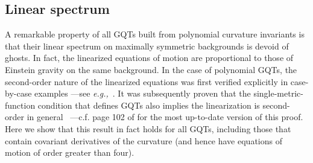 \documentclass[11pt]{article}
\newcommand{\eg}{{\it e.g.,}\ }
\begin{document}
{\subsection{Linear spectrum}\label{subsec:linearGQT}
A remarkable property of all GQTs built from polynomial curvature invariants is that their linear spectrum on maximally symmetric backgrounds is devoid of ghosts. In fact, the linearized equations of motion are proportional to those of Einstein gravity on the same background. In the case of polynomial GQTs, the second-order nature of the linearized equations was first verified explicitly in case-by-case examples ---see \eg \cite{Quasi2,Quasi, PabloPablo, Hennigar:2017ego, Ahmed:2017jod}. It was subsequently proven that the single-metric-function condition that defines GQTs also implies the linearization is second-order in general~\cite{PabloPablo3} ---c.f. page 102 of \cite{CanoMolina-Ninirola:2019uzm} for the most up-to-date version of this proof. 
Here we show that this result in fact holds for all GQTs, including those that contain covariant derivatives of the curvature (and hence have equations of motion of order greater than four). 

}
\end{document}
